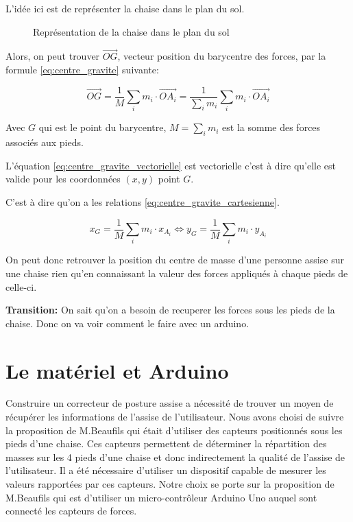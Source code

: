 \documentclass{polytech/polytech}
\begin{document}
L'idée ici est de représenter la chaise dans le plan du sol. 


\begin{figure}[htbp]



\caption{Représentation de la chaise dans le plan du sol}
\label{fig:schem_plan_sol_math}
\end{figure}

Alors, on peut trouver $\vec{OG}$, vecteur position du barycentre des forces, par la formule \eqref{eq:centre_gravite}  suivante:

\begin{equation}
\label{eq:centre_gravite_vectorielle}
\vec{OG} = \frac{1}{M} \sum_i m_i  \cdot \vec{OA_i} =   \frac{1}{\sum_i m_i} \sum_i m_i  \cdot \vec{OA_i} 
\end{equation}

Avec $G$ qui est le point du barycentre, $M=\sum_i m_i$ est la somme des forces associés aux pieds.

L'équation \eqref{eq:centre_gravite_vectorielle} est vectorielle c'est à dire qu'elle est valide pour les coordonnées $(x,y)$ point $G$.

C'est à dire qu'on a les relations \eqref{eq:centre_gravite_cartesienne}.

\begin{equation}
\label{eq:centre_gravite_cartesienne}
x_G = \frac{1}{M} \sum_i m_i  \cdot x_{A_i} \Leftrightarrow  y_G = \frac{1}{M} \sum_i m_i  \cdot y_{A_i}
\end{equation}

On peut donc retrouver la position du centre de masse d'une personne assise sur une chaise rien qu'en connaissant la valeur des forces appliqués à chaque pieds de celle-ci.




\textbf{Transition:} On sait qu'on a besoin de recuperer les forces sous les pieds de la chaise. Donc on va voir comment le faire avec un arduino.

\section{Le matériel et Arduino}
\label{chap:arduino}

Construire un correcteur de posture assise a nécessité de trouver un moyen de récupérer les informations de l'assise de l'utilisateur. Nous avons choisi de suivre la proposition de M.Beaufils qui était d'utiliser des capteurs positionnés sous les pieds d'une chaise. Ces capteurs permettent de déterminer la répartition des masses sur les 4 pieds d'une chaise et donc indirectement la qualité de l'assise de l'utilisateur. Il a été nécessaire d'utiliser un dispositif capable de mesurer les valeurs rapportées par ces capteurs. Notre choix se porte sur la proposition de M.Beaufils qui est d'utiliser un  micro-contrôleur Arduino Uno auquel sont connecté les capteurs de forces. 
\end{document}
